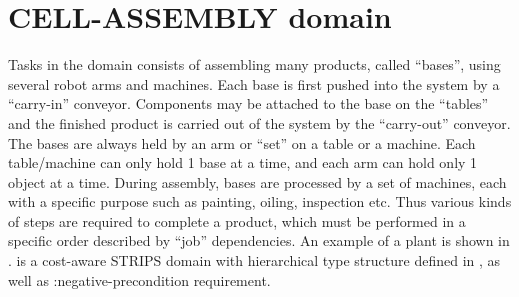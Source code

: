 ﻿%

\newcommand{\pddl}[1]{{\small \textsf{#1}}}
\newcommand{\pddls}[1]{{\scriptsize \textsf{#1}}}

\section{CELL-ASSEMBLY domain}
\label{sec-1}

Tasks in the {\ca} domain consists of assembling many products, called ``bases'', 
using several robot arms and machines.
Each base is first pushed into the system by a ``carry-in'' conveyor.
Components may be attached to the base on the ``tables'' and
the finished product is carried out of the system by the ``carry-out'' conveyor.
The bases are always held by an arm or ``set'' on a table or a machine.
Each table/machine can only hold 1 base at a time, %
 and each arm can hold only 1 object at a time. 
During assembly, bases are  processed by a set of machines, 
 each with a specific purpose such as painting, oiling, inspection etc.
Thus various kinds of steps are required to complete a product, which must
be performed in a specific order described by ``job'' dependencies.
An example of a {\ca} plant is shown in .
%
{\ca} is a cost-aware STRIPS domain with hierarchical type structure
 defined in \cite{Bacchus2000}, 
as well as \pddl{:negative-precondition} requirement.

